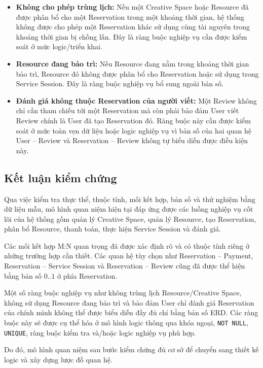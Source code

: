 \begin{itemize}
\item \textbf{Không cho phép trùng lịch:} Nếu một Creative Space hoặc Resource đã được phân bổ cho một Reservation trong một khoảng thời gian, hệ thống không được cho phép một Reservation khác sử dụng cùng tài nguyên trong khoảng thời gian bị chồng lấn. Đây là ràng buộc nghiệp vụ cần được kiểm soát ở mức logic/triển khai.

\item \textbf{Resource đang bảo trì:} Nếu Resource đang nằm trong khoảng thời gian bảo trì, Resource đó không được phân bổ cho Reservation hoặc sử dụng trong Service Session. Đây là ràng buộc nghiệp vụ bổ sung ngoài bản số.

\item \textbf{Đánh giá không thuộc Reservation của người viết:} Một Review không chỉ cần tham chiếu tới một Reservation mà còn phải bảo đảm User viết Review chính là User đã tạo Reservation đó. Ràng buộc này cần được kiểm soát ở mức toàn vẹn dữ liệu hoặc logic nghiệp vụ vì bản số của hai quan hệ User -- Review và Reservation -- Review không tự biểu diễn được điều kiện này.

\end{itemize}

\subsection{Kết luận kiểm chứng}

Qua việc kiểm tra thực thể, thuộc tính, mối kết hợp, bản số và thử nghiệm bằng dữ liệu mẫu, mô hình quan niệm hiện tại đáp ứng được các luồng nghiệp vụ cốt lõi của hệ thống gồm quản lý Creative Space, quản lý Resource, tạo Reservation, phân bổ Resource, thanh toán, thực hiện Service Session và đánh giá.

Các mối kết hợp M:N quan trọng đã được xác định rõ và có thuộc tính riêng ở những trường hợp cần thiết. Các quan hệ tùy chọn như Reservation -- Payment, Reservation -- Service Session và Reservation -- Review cũng đã được thể hiện bằng bản số $0..1$ ở phía Reservation.

Một số ràng buộc nghiệp vụ như không trùng lịch Resource/Creative Space, không sử dụng Resource đang bảo trì và bảo đảm User chỉ đánh giá Reservation của chính mình không thể được biểu diễn đầy đủ chỉ bằng bản số ERD. Các ràng buộc này sẽ được cụ thể hóa ở mô hình logic thông qua khóa ngoại, \texttt{NOT NULL}, \texttt{UNIQUE}, ràng buộc kiểm tra và/hoặc logic nghiệp vụ phù hợp.

Do đó, mô hình quan niệm sau bước kiểm chứng đủ cơ sở để chuyển sang thiết kế logic và xây dựng lược đồ quan hệ.


